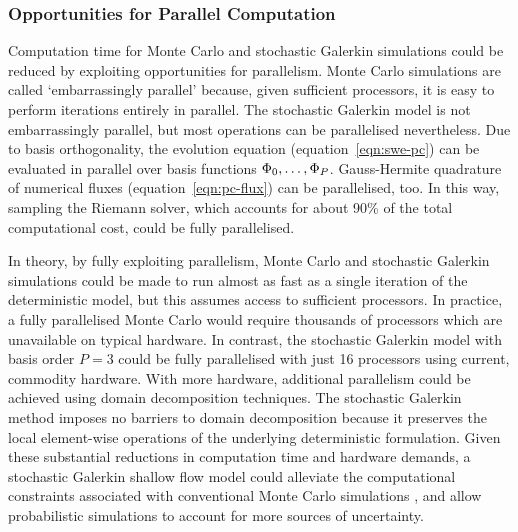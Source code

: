 \subsubsection{Opportunities for Parallel Computation}

Computation time for Monte Carlo and stochastic Galerkin simulations could be reduced by exploiting opportunities for parallelism.
Monte Carlo simulations are called `embarrassingly parallel' because, given sufficient processors, it is easy to perform iterations entirely in parallel.
The stochastic Galerkin model is not embarrassingly parallel, but most operations can be parallelised nevertheless.
Due to basis orthogonality, the evolution equation (equation~\ref{eqn:swe-pc}) can be evaluated in parallel over basis functions $\Phi_0, \ldots, \Phi_P$.
Gauss-Hermite quadrature of numerical fluxes (equation~\ref{eqn:pc-flux}) can be parallelised, too.
In this way, sampling the Riemann solver, which accounts for about 90\% of the total computational cost, could be fully parallelised.

In theory, by fully exploiting parallelism, Monte Carlo and stochastic Galerkin simulations could be made to run almost as fast as a single iteration of the deterministic model, but this assumes access to sufficient processors.
In practice, a fully parallelised Monte Carlo would require thousands of processors which are unavailable on typical hardware.
In contrast, the stochastic Galerkin model with basis order $P=3$ could be fully parallelised with just 16 processors using current, commodity hardware.
With more hardware, additional parallelism could be achieved using domain decomposition techniques.
The stochastic Galerkin method imposes no barriers to domain decomposition because it preserves the local element-wise operations of the underlying deterministic formulation.
Given these substantial reductions in computation time and hardware demands, a stochastic Galerkin shallow flow model could alleviate the computational constraints associated with conventional Monte Carlo simulations \citep{neal2013}, and allow probabilistic simulations to account for more sources of uncertainty.